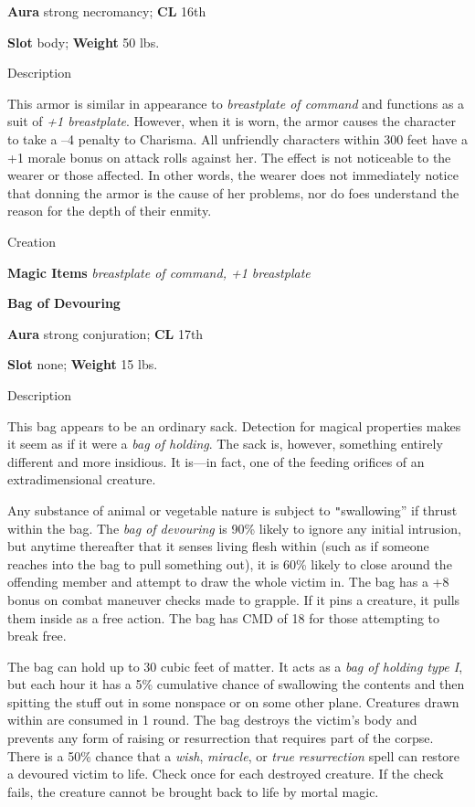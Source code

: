 \textbf{Aura} strong necromancy; \textbf{CL} 16th
				
\textbf{Slot} body; \textbf{Weight }50 lbs.
				
Description
				
This armor is similar in appearance to \textit{breastplate of command} and functions as a suit of \textit{+1 breastplate}. However, when it is worn, the armor causes the character to take a --4 penalty to Charisma. All unfriendly characters within 300 feet have a +1 morale bonus on attack rolls against her. The effect is not noticeable to the wearer or those affected. In other words, the wearer does not immediately notice that donning the armor is the cause of her problems, nor do foes understand the reason for the depth of their enmity.
				
Creation
				
\textbf{Magic Items}\textit{ breastplate of command, +1 breastplate}
				
\textbf{Bag of Devouring}
				
\textbf{Aura} strong conjuration; \textbf{CL} 17th
				
\textbf{Slot} none; \textbf{Weight }15 lbs.
				
Description
				
This bag appears to be an ordinary sack. Detection for magical properties makes it seem as if it were a \textit{bag of holding}. The sack is, however, something entirely different and more insidious. It is---in fact, one of the feeding orifices of an extradimensional creature.
				
Any substance of animal or vegetable nature is subject to \texttt{{}"{}}swallowing'' if thrust within the bag. The \textit{bag of devouring }is 90\% likely to ignore any initial intrusion, but anytime thereafter that it senses living flesh within (such as if someone reaches into the bag to pull something out), it is 60\% likely to close around the offending member and attempt to draw the whole victim in. The bag has a +8 bonus on combat maneuver checks made to grapple. If it pins a creature, it pulls them inside as a free action. The bag has CMD of 18 for those attempting to break free.
				
The bag can hold up to 30 cubic feet of matter. It acts as a \textit{bag of holding type I}, but each hour it has a 5\% cumulative chance of swallowing the contents and then spitting the stuff out in some nonspace or on some other plane. Creatures drawn within are consumed in 1 round. The bag destroys the victim's body and prevents any form of raising or resurrection that requires part of the corpse. There is a 50\% chance that a \textit{wish}, \textit{miracle}, or \textit{true resurrection} spell can restore a devoured victim to life. Check once for each destroyed creature. If the check fails, the creature cannot be brought back to life by mortal magic. 
				
